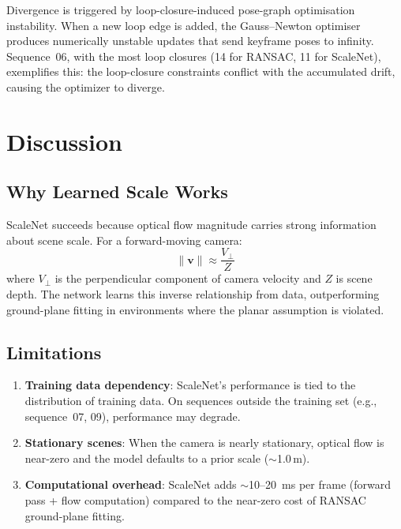 \documentclass[12pt,a4paper]{article}
\begin{document}
Divergence is triggered by loop-closure-induced pose-graph optimisation instability. When a new loop edge is added, the Gauss--Newton optimiser produces numerically unstable updates that send keyframe poses to infinity. Sequence~06, with the most loop closures (14 for RANSAC, 11 for ScaleNet), exemplifies this: the loop-closure constraints conflict with the accumulated drift, causing the optimizer to diverge.

\section{Discussion}

\subsection{Why Learned Scale Works}

ScaleNet succeeds because optical flow magnitude carries strong information about scene scale. For a forward-moving camera:
\begin{equation}
    \|\mathbf{v}\| \approx \frac{V_\perp}{Z}
\end{equation}
where $V_\perp$ is the perpendicular component of camera velocity and $Z$ is scene depth. The network learns this inverse relationship from data, outperforming ground-plane fitting in environments where the planar assumption is violated.

\subsection{Limitations}

\begin{enumerate}
    \item \textbf{Training data dependency}: ScaleNet's performance is tied to the distribution of training data. On sequences outside the training set (e.g., sequence~07, 09), performance may degrade.
    \item \textbf{Stationary scenes}: When the camera is nearly stationary, optical flow is near-zero and the model defaults to a prior scale ($\sim$1.0\,m).
    \item \textbf{Computational overhead}: ScaleNet adds $\sim$10--20~ms per frame (forward pass + flow computation) compared to the near-zero cost of RANSAC ground-plane fitting.
\end{enumerate}
\end{document}
